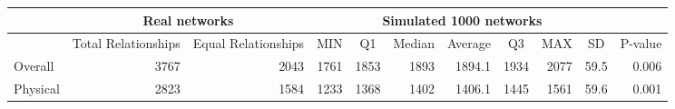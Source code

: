 \begin{table}[H]
{\begin{tabular}{l|rr|rrrrrrr|r}
\cline{2-10}
                                                      & \multicolumn{2}{c|}{\cellcolor[HTML]{F7CAAC}Real networks}                                                                         & \multicolumn{7}{c|}{\cellcolor[HTML]{FFE599}Simulated 1000 networks}                                                                                                                                                                                                                                                                                             & \multicolumn{1}{c}{}                                 \\ \hline
\rowcolor[HTML]{FFF2CC} 
\multicolumn{1}{|c|}{\cellcolor[HTML]{D9E2F3}Network} & \multicolumn{1}{c}{\cellcolor[HTML]{FBE4D5}Total Relationships} & \multicolumn{1}{c|}{\cellcolor[HTML]{FBE4D5}Equal Relationships} & \multicolumn{1}{c}{\cellcolor[HTML]{FFF2CC}MIN} & \multicolumn{1}{c}{\cellcolor[HTML]{FFF2CC}Q1} & \multicolumn{1}{c}{\cellcolor[HTML]{FFF2CC}Median} & \multicolumn{1}{c}{\cellcolor[HTML]{FFF2CC}Average} & \multicolumn{1}{c}{\cellcolor[HTML]{FFF2CC}Q3} & \multicolumn{1}{c}{\cellcolor[HTML]{FFF2CC}MAX} & \multicolumn{1}{c|}{\cellcolor[HTML]{FFF2CC}SD} & \multicolumn{1}{c|}{\cellcolor[HTML]{E2EFD9}P-value} \\ \hline
\multicolumn{1}{|l|}{Overall}                         & {\color[HTML]{9B9B9B} 3767}                                     & 2043                                                             & {\color[HTML]{9B9B9B} 1761}                     & {\color[HTML]{9B9B9B} 1853}                    & {\color[HTML]{9B9B9B} 1893}                        & 1894.1                                              & {\color[HTML]{9B9B9B} 1934}                    & {\color[HTML]{9B9B9B} 2077}                     & {\color[HTML]{9B9B9B} 59.5}                     & \multicolumn{1}{r|}{0.006}                           \\
\multicolumn{1}{|l|}{Physical}                        & {\color[HTML]{9B9B9B} 2823}                                     & 1584                                                             & {\color[HTML]{9B9B9B} 1233}                     & {\color[HTML]{9B9B9B} 1368}                    & {\color[HTML]{9B9B9B} 1402}                        & 1406.1                                              & {\color[HTML]{9B9B9B} 1445}                    & {\color[HTML]{9B9B9B} 1561}                     & {\color[HTML]{9B9B9B} 59.6}                     & \multicolumn{1}{r|}{0.001}                           \\

\end{tabular}}
\end{table}
